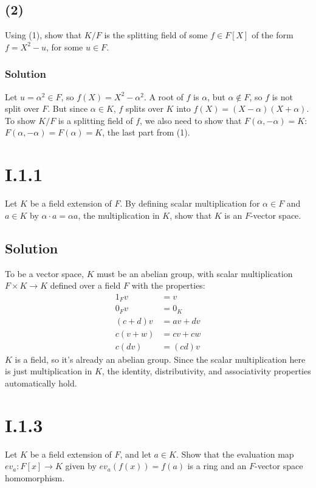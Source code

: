 \documentclass[fleqn]{article}
\begin{document}
        \subsection{(2)}
        Using (1), show that $K/F$ is the splitting field of some $f \in F[X]$ of the form $f = X^2 - u$, for some $u \in F$.
            
            \subsubsection{Solution}
            Let $u = \alpha^2 \in F$, so $f(X) = X^2 - \alpha^2$.  A root of $f$ is $\alpha$, but $\alpha \notin F$, so $f$ is not split over $F$.  But since $\alpha \in K$, $f$ splits over $K$ into $f(X) = (X - \alpha)(X + \alpha)$.  To show $K/F$ is a splitting field of $f$, we also need to show that $F(\alpha, -\alpha) = K$: $F(\alpha, -\alpha) = F(\alpha) = K$, the last part from (1).
    
    \section{I.1.1}
    Let $K$ be a field extension of $F$.  By defining scalar multiplication for $\alpha \in F$ and $a \in K$ by $\alpha \cdot a = \alpha a$, the multiplication in $K$, show that $K$ is an $F$-vector space.
        
        \subsection{Solution}
        To be a vector space, $K$ must be an abelian group, with scalar multiplication $F \times K \to K$ defined over a field $F$ with the properties:
        \begin{align}
            1_F v &= v \\
            0_F v &= 0_K \\
            (c + d) v &= av + dv \\
            c(v + w) &= cv + cw \\
            c(dv) &= (cd) v
        \end{align}
        $K$ is a field, so it's already an abelian group.  Since the scalar multiplication here is just multiplication in $K$, the identity, distributivity, and associativity properties automatically hold.
    
    \section{I.1.3}
    Let $K$ be a field extension of $F$, and let $a \in K$.  Show that the evaluation map $ev_a: F[x] \to K$ given by $ev_a(f(x)) = f(a)$ is a ring and an $F$-vector space homomorphism.
    
\end{document}
